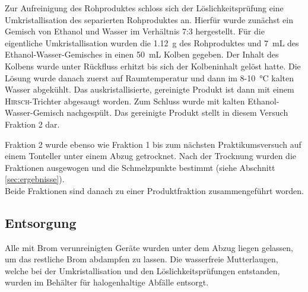 Zur Aufreinigung des Rohproduktes schloss sich der Löslichkeitsprüfung eine Umkristallisation des separierten Rohproduktes an. Hierfür wurde zunächst ein Gemisch von Ethanol und Wasser im Verhältnis 7:3 hergestellt. Für die eigentliche Umkristallisation wurden die \SI{1,12}{\gram} des Rohproduktes und \SI{7}{\milli \liter} des Ethanol-Wasser-Gemisches in einen \SI{50}{\milli \liter} Kolben gegeben. Der Inhalt des Kolbens wurde unter Rückfluss erhitzt bis sich der Kolbeninhalt gelöst hatte. Die Lösung wurde danach zuerst auf Raumtemperatur und dann im 8-\SI{10}{\celsius} kalten Wasser abgekühlt. Das auskristallisierte, gereinigte Produkt ist dann mit einem \textsc{Hirsch}-Trichter abgesaugt worden. Zum Schluss wurde mit kalten Ethanol-Wasser-Gemisch nachgespült. Das gereinigte Produkt stellt in diesem Versuch Fraktion 2 dar.

Fraktion 2 wurde ebenso wie Fraktion 1 bis zum nächsten Praktikumsversuch auf einem Tonteller unter einem Abzug getrocknet. Nach der Trocknung wurden die Fraktionen ausgewogen und die Schmelzpunkte bestimmt (siehe Abschnitt \ref{sec:ergebnisse}).\\
Beide Fraktionen sind danach zu einer Produktfraktion zusammengeführt worden.\\

\subsection*{Entsorgung}
Alle mit Brom verunreinigten Geräte wurden unter dem Abzug liegen gelassen, um das restliche Brom abdampfen zu lassen. Die wasserfreie Mutterlaugen, welche bei der Umkristallisation und den Löslichkeitsprüfungen entstanden, wurden im Behälter für halogenhaltige Abfälle entsorgt.
